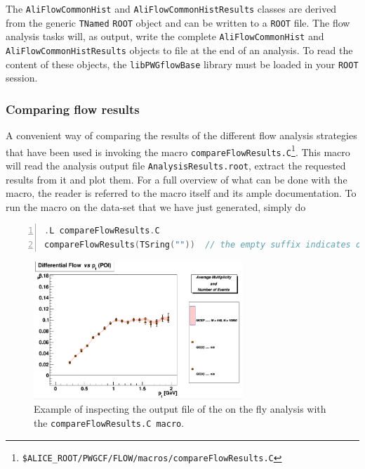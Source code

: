 \documentclass[a4paper]{book}
\numberwithin{equation}{subsection}
\begin{document}
The \texttt{AliFlowCommonHist} and \texttt{AliFlowCommonHistResults} classes are derived from the generic \texttt{TNamed} \texttt{ROOT} object and can be written to a \texttt{ROOT} file. The flow analysis tasks will, as output, write the complete \texttt{AliFlowCommonHist} and \texttt{AliFlowCommonHistResults} objects to file at the end of an analysis. To read the content of these objects, the \texttt{libPWGflowBase} library must be loaded in your \texttt{ROOT} session. 

\subsubsection{Comparing flow results}
A convenient way of comparing the results of the different flow analysis strategies that have been used is invoking the macro \texttt{compareFlowResults.C}\footnote{\texttt{\$ALICE\_ROOT/PWGCF/FLOW/macros/compareFlowResults.C}}.  This macro will read the analysis output file \texttt{AnalysisResults.root}, extract the requested results from it and plot them. For a full overview of what can be done with the macro, the reader is referred to the macro itself and its ample documentation. To run the macro on the data-set that we have just generated, simply do
\begin{lstlisting}[language=C, numbers=left]
.L compareFlowResults.C
compareFlowResults(TSring(""))	// the empty suffix indicates on the fly events \end{lstlisting}

\begin{figure}
 \includegraphics[width=0.70\textwidth]{figs/compareFlowResults.png}
 \caption[Comparing on the fly flow results]{Example of inspecting the output file of the on the fly analysis with the \texttt{compareFlowResults.C macro}.}
 \label{fig:browserExample}
\end{figure}
\end{document}
